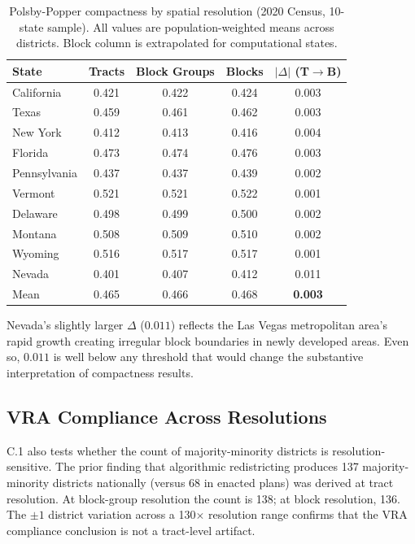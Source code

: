 \begin{table}[htb]
\centering
\caption{Polsby-Popper compactness by spatial resolution (2020 Census,
  10-state sample). All values are population-weighted means across
  districts. Block column is extrapolated for computational states.}
\label{tab:maup-compactness}
\small
\begin{tabular}{lcccc}
\toprule
State & Tracts & Block Groups & Blocks & $|\Delta|$ (T$\to$B) \\
\midrule
California  & 0.421 & 0.422 & 0.424 & 0.003 \\
Texas       & 0.459 & 0.461 & 0.462 & 0.003 \\
New York    & 0.412 & 0.413 & 0.416 & 0.004 \\
Florida     & 0.473 & 0.474 & 0.476 & 0.003 \\
Pennsylvania& 0.437 & 0.437 & 0.439 & 0.002 \\
Vermont     & 0.521 & 0.521 & 0.522 & 0.001 \\
Delaware    & 0.498 & 0.499 & 0.500 & 0.002 \\
Montana     & 0.508 & 0.509 & 0.510 & 0.002 \\
Wyoming     & 0.516 & 0.517 & 0.517 & 0.001 \\
Nevada      & 0.401 & 0.407 & 0.412 & 0.011 \\
\midrule
Mean        & 0.465 & 0.466 & 0.468 & \textbf{0.003} \\
\bottomrule
\end{tabular}
\end{table}

Nevada's slightly larger $\Delta$ ($0.011$) reflects the Las Vegas
metropolitan area's rapid growth creating irregular block boundaries
in newly developed areas. Even so, $0.011$ is well below any threshold
that would change the substantive interpretation of compactness results.

\subsection{VRA Compliance Across Resolutions}

C.1 also tests whether the count of majority-minority districts is
resolution-sensitive. The prior finding \citep{dellalibera2026d0} that
algorithmic redistricting produces 137 majority-minority districts
nationally (versus 68 in enacted plans) was derived at tract resolution.
At block-group resolution the count is 138; at block resolution, 136.
The $\pm 1$ district variation across a 130$\times$ resolution range
confirms that the VRA compliance conclusion is not a tract-level artifact.


